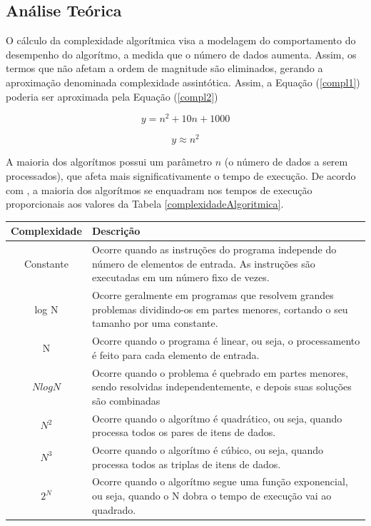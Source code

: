 {	\subsection{Análise Teórica}

	 O cálculo da complexidade algorítmica visa a modelagem do comportamento do desempenho do algorítmo, a medida que o número de dados aumenta. Assim, os termos que não afetam a ordem de magnitude são eliminados, gerando a aproximação denominada complexidade assintótica. Assim, a  Equação (\ref{compl1}) poderia ser aproximada pela  Equação (\ref{compl2})

	\begin{equation}
		y = n^{2} +10 n + 1000
	\label{compl1}
	\end{equation}

	\begin{equation}
		y \approx  n^{2} 
	\label{compl2}
	\end{equation}

	A maioria dos algorítmos possui um parâmetro $n$ (o número de dados a serem processados), que afeta mais significativamente o tempo de execução. De acordo com \cite{complexidade2}, a maioria dos algorítmos se enquadram nos tempos de execução proporcionais aos valores da Tabela \ref{complexidadeAlgoritmica}.

\begin{table}[ht]
	\centering	
	\begin{tabularx}{0.9\textwidth}{cX}
		\toprule
		\textbf{Complexidade} & \textbf{Descrição}  \\
		\midrule
		Constante &  Ocorre quando as instruções do programa independe do número de elementos de entrada. As instruções são executadas em um número fixo de vezes.\\
		log N & Ocorre geralmente em programas que resolvem grandes problemas dividindo-os em partes menores, cortando o seu tamanho por uma constante.  \\
		N & Ocorre quando o programa é linear, ou seja, o  processamento é feito para cada elemento de entrada. \\
		$ N log N$ & Ocorre quando o problema é quebrado em partes menores, sendo resolvidas independentemente, e depois suas soluções são combinadas \\
		$ N^{2}$ & Ocorre quando o algorítmo é quadrático, ou seja, quando processa todos os pares de itens de dados. \\
		$ N^{3}$ & Ocorre quando o algorítmo é cúbico, ou seja, quando processa todos as triplas de itens de dados. \\
		$ 2^{N}$ & Ocorre quando o algorítmo segue uma função exponencial, ou seja, quando o N dobra o tempo de execução vai ao quadrado. \\
	

\end{tabularx}
\end{table}}
